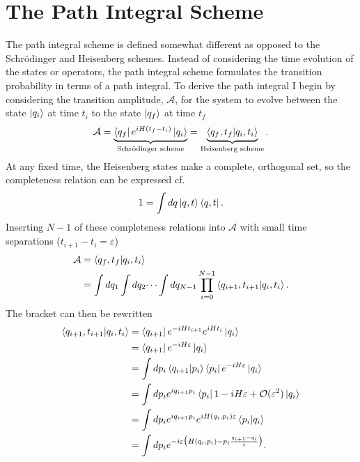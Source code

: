 \section{The Path Integral Scheme}
\label{sec:path scheme}
The path integral scheme is defined somewhat different as opposed to the Schrödinger and Heisenberg schemes. Instead of considering the time evolution of the states or operators, the path integral scheme formulates the transition probability in terms of a path integral. To derive the path integral I begin by considering the transition amplitude, $\mathcal{A}$, for the system to evolve between the state $\ket{q_i}$ at time $t_i$ to the state $\ket{q_f}$ at time $t_f$
\begin{equation}
	\mathcal{A}=\underbrace{\bra{q_f}e^{iH(t_f-t_i)}\ket{q_i}}_{\text{Schrödinger scheme}}=\underbrace{\braket{q_f,t_f|q_i,t_i}}_{\text{Heisenberg scheme}}.
\end{equation} 
At any fixed time, the Heisenberg states make a complete, orthogonal set, so the completeness relation can be expressed cf.
\begin{equation}
	1=\int dq \ket{q,t}\bra{q,t}.
\end{equation} 
Inserting $N-1$ of these completeness relations into $\mathcal{A}$ with small time separations ($t_{i+1}-t_i=\varepsilon$)
\begin{equation}
	\begin{split}
		\mathcal{A}&=\braket{q_f,t_f|q_i,t_i}\\
		&=\int dq_1\int dq_2 \dots \int dq_{N-1}\prod_{i=0}^{N-1}\braket{q_{i+1},t_{i+1}|q_i,t_i}.
	\end{split}
\end{equation} 
The bracket can then be rewritten
\begin{equation}
	\begin{split}
		\braket{q_{i+1},t_{i+1}|q_i,t_i}&=\bra{q_{i+1}}e^{-iHt_{i+1}}e^{iHt_{i}}\ket{q_i}\\
		&=\bra{q_{i+1}}e^{-iH\varepsilon}\ket{q_i}\\
		&=\int dp_i\braket{q_{i+1}|p_i}\bra{p_i}e^{-iH\varepsilon}\ket{q_i}\\
		&=\int dp_ie^{iq_{i+1}p_i}\bra{p_i}1-iH\varepsilon+\mathcal{O}(\varepsilon^2)\ket{q_i}\\
		&=\int dp_ie^{iq_{i+1}p_i}e^{iH(q_i,p_i)\varepsilon}\braket{p_i|q_i}\\
		&=\int dp_ie^{-i\varepsilon\big(H(q_i,p_i)-p_i\frac{q_{i+1}-q_i}{\varepsilon}\big)}.\\
	\end{split}
\end{equation} 
